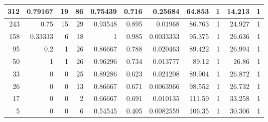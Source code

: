 \documentclass[12pt]{article}
\begin{document}
\begin{sidewaystable}
{\begin{tabular}{rrr|rr|rr|rr|rr}
312 & 0.79167 & 19 & 86 & 0.75439 & 0.716 & 0.25684 & 64.853 & 1 & 14.213 & 1\\
\hline
243 & 0.75 & 15 & 29 & 0.93548 & 0.895 & 0.01968 & 86.763 & 1 & 24.927 & 1\\
158 & 0.33333 & 6 & 18 & 1 & 0.985 & 0.0033333 & 95.375 & 1 & 26.636 & 1\\
95 & 0.2 & 1 & 26 & 0.86667 & 0.788 & 0.020463 & 89.422 & 1 & 26.994 & 1\\
50 & 1 & 1 & 26 & 0.96296 & 0.734 & 0.013777 & 89.12 & 1 & 26.86 & 1\\
33 & 0 & 0 & 25 & 0.89286 & 0.623 & 0.021208 & 89.904 & 1 & 26.872 & 1\\
26 & 0 & 0 & 13 & 0.86667 & 0.671 & 0.0063966 & 98.552 & 1 & 26.732 & 1\\
17 & 0 & 0 & 2 & 0.66667 & 0.691 & 0.010135 & 111.59 & 1 & 33.258 & 1\\
5 & 0 & 0 & 6 & 0.54545 & 0.405 & 0.0082559 & 106.35 & 1 & 30.306 & 1\\
\end{tabular}
}
\end{sidewaystable}
\end{document}
